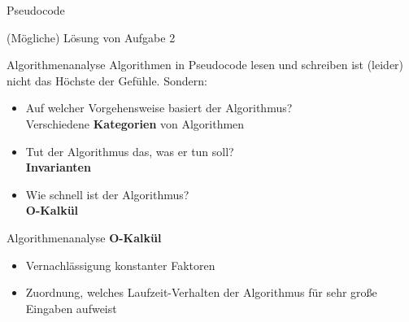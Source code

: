 \begin{frame}{Pseudocode}
	\begin{exampleblock}{(Mögliche) Lösung von Aufgabe 2}
		\begin{algorithm}[H]
		\end{algorithm}
	\end{exampleblock}
\end{frame}


\begin{frame}{Algorithmenanalyse}
	Algorithmen in Pseudocode lesen und schreiben ist (leider) nicht das Höchste der Gefühle. Sondern:
	\begin{itemize}
		\pause
		\item Auf welcher Vorgehensweise basiert der Algorithmus? \\
		\pause
		\impl Verschiedene \textbf{Kategorien} von Algorithmen
		\pause
		\item Tut der Algorithmus das, was er tun soll? \\
		\pause
		\impl \textbf{Invarianten}
		\pause
		\item Wie schnell ist der Algorithmus? \\
		\pause
		\impl \textbf{O-Kalkül}
	\end{itemize}
\end{frame}


\begin{frame}{Algorithmenanalyse}
	\textbf{O-Kalkül} \\[0,125cm]
	\begin{itemize}
		\item Vernachlässigung konstanter Faktoren
		\item Zuordnung, welches Laufzeit-Verhalten der Algorithmus für sehr große Eingaben aufweist
	\end{itemize}
\end{frame}



